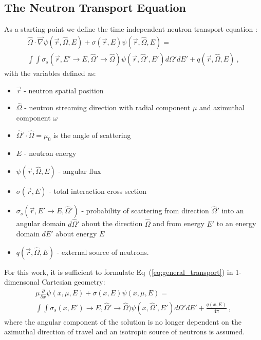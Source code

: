 \documentclass[letterpaper,12pt]{article}
\begin{document}
\subsection{The Neutron Transport Equation}
\label{subsec:transport_eq}
As a starting point we define the time-independent neutron transport
equation \cite{lewis_computational_1993}:
\begin{multline}
  \hat{\Omega} \cdot \vec{\nabla} \psi(\vec{r},\hat{\Omega},E) +
  \sigma(\vec{r},E) \psi(\vec{r},\hat{\Omega},E) = \\ \int \int
  \sigma_s(\vec{r},E' \rightarrow E,\hat{\Omega}' \rightarrow
  \hat{\Omega}) \psi(\vec{r},\hat{\Omega}',E') d\Omega' dE' +
  q(\vec{r},\hat{\Omega},E)\:,
  \label{eq:general_transport}
\end{multline}
with the variables defined as:
\begin{itemize}
\item $\vec{r}$ - neutron spatial position
\item $\hat{\Omega}$ - neutron streaming direction with radial
  component $\mu$ and azimuthal component $\omega$
\item $\hat{\Omega}' \cdot \hat{\Omega} = \mu_0$ is the angle of
  scattering
\item $E$ - neutron energy
\item $\psi(\vec{r},\hat{\Omega},E)$ - angular flux
\item $\sigma(\vec{r},E)$ - total interaction cross section
\item $\sigma_s(\vec{r},E' \rightarrow E,\hat{\Omega}')$ - probability
  of scattering from direction $\hat{\Omega}'$ into an angular domain
  $d\hat{\Omega}'$ about the direction $\hat{\Omega}$ and from energy
  $E'$ to an energy domain $dE'$ about energy $E$
\item $q(\vec{r},\hat{\Omega},E)$ - external source of neutrons.
\end{itemize}
For this work, it is sufficient to formulate
Eq~(\ref{eq:general_transport}) in 1-dimensonal Cartesian geometry:
\begin{multline}
  \mu \frac{\partial}{\partial x} \psi(x,\mu,E) + \sigma(x,E)
  \psi(x,\mu,E) = \\ \int \int \sigma_s(x,E') \rightarrow
  E,\hat{\Omega}' \rightarrow \hat{\Omega}) \psi(x,\hat{\Omega}',E')
  d\Omega' dE' + \frac{q(x,E)}{4 \pi}\:,
  \label{eq:cart_1d_transport}
\end{multline}
where the angular component of the solution is no longer dependent on
the azimuthal direction of travel and an isotropic source of neutrons
is assumed.
\end{document}
